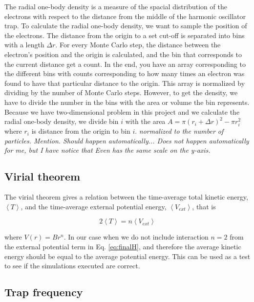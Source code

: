 The radial one-body density is a measure of the spacial distribution of the electrons with respect to the distance from the middle of the harmonic oscillator trap. To calculate the radial one-body density, we want to sample the position of the electrons. The distance from the origin to a set cut-off is separated into bins with a length $\Delta r$. For every Monte Carlo step, the distance between the electron's position and the origin is calculated, and the bin that corresponds to the current distance get a count. In the end, you have an array corresponding to the different bins with counts corresponding to how many times an electron was found to have that particular distance to the origin. This array is normalized by dividing by the number of Monte Carlo steps. However, to get the density, we have to divide the number in the bins with the area or volume the bin represents. Because we have two-dimensional problem in this project and we calculate the radial one-body density, we divide bin $i$ with the area $ A = \pi (r_i+\Delta r)^2 - \pi r_i^2$ where $r_i$ is distance from the origin to bin $i$. \textit{normalized to the number of particles. Mention. Should happen automatically... Does not happen automatically for me, but I have notice that Even has the same scale on the y-axis.}\cite{Evens_master}

\subsection{Virial theorem}

The virial theorem gives a relation between the time-average total kinetic energy, $\left<T\right>$, and the time-average external potential energy, $\left<V_{ext}\right>$, that is

\begin{equation}\label{eq:virial_theorem}
2\left< T\right> = n\left< V_{ext}\right>
\end{equation}

where $V(r) = Br^n$. In our case when we do not include interaction $n = 2$ from the external potential term in Eq. \ref{eq:finalH}, and therefore the average kinetic energy should be equal to the average potential energy. This can be used as a test to see if the simulations executed are correct. 

\subsection{Trap frequency}

